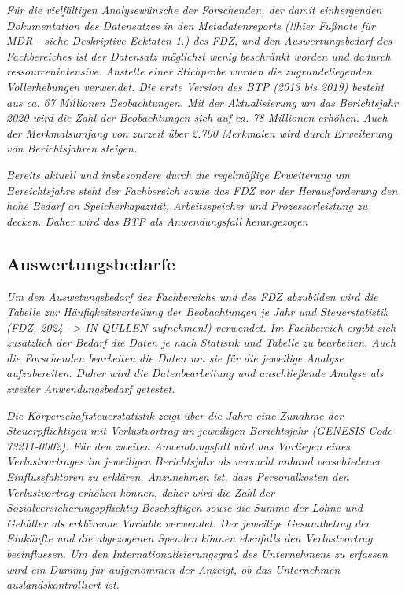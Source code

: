 \documentclass[
  german,
  10pt,
  twoside]{article}
\begin{document}
\emph{Für die vielfältigen Analysewünsche der Forschenden, der damit
einhergenden Dokumentation des Datensatzes in den Metadatenreports
(!!hier Fußnote für MDR - siehe Deskriptive Ecktaten 1.) des FDZ, und
den Auswertungsbedarf des Fachbereiches ist der Datensatz möglichst
wenig beschränkt worden und dadurch ressourcenintensive. Anstelle einer
Stichprobe wurden die zugrundeliegenden Vollerhebungen verwendet. Die
erste Version des BTP (2013 bis 2019) besteht aus ca. 67 Millionen
Beobachtungen. Mit der Aktualisierung um das Berichtsjahr 2020 wird die
Zahl der Beobachtungen sich auf ca. 78 Millionen erhöhen. Auch der
Merkmalsumfang von zurzeit über 2.700 Merkmalen wird durch Erweiterung
von Berichtsjahren steigen.}

\emph{Bereits aktuell und insbesondere durch die regelmäßige Erweiterung
um Bereichtsjahre steht der Fachbereich sowie das FDZ vor der
Herausforderung den hohe Bedarf an Speicherkapazität, Arbeitsspeicher
und Prozessorleistung zu decken. Daher wird das BTP als Anwendungsfall
herangezogen}

\subsection{Auswertungsbedarfe}\label{auswertungsbedarfe}

\emph{Um den Auswetungsbedarf des Fachbereichs und des FDZ abzubilden
wird die Tabelle zur Häufigkeitsverteilung der Beobachtungen je Jahr und
Steuerstatistik (FDZ, 2024 --\textgreater{} IN QULLEN aufnehmen!)
verwendet. Im Fachbereich ergibt sich zusätzlich der Bedarf die Daten je
nach Statistik und Tabelle zu bearbeiten. Auch die Forschenden
bearbeiten die Daten um sie für die jeweilige Analyse aufzubereiten.
Daher wird die Datenbearbeitung und anschließende Analyse als zweiter
Anwendungsbedarf getestet.}

\emph{Die Körperschaftsteuerstatistik zeigt über die Jahre eine Zunahme
der Steuerpflichtigen mit Verlustvortrag im jeweiligen Berichtsjahr
(GENESIS Code 73211-0002). Für den zweiten Anwendungsfall wird das
Vorliegen eines Verlustvortrages im jeweiligen Berichtsjahr als versucht
anhand verschiedener Einflussfaktoren zu erklären. Anzunehmen ist, dass
Personalkosten den Verlustvortrag erhöhen können, daher wird die Zahl
der Sozialversicherungspflichtig Beschäftigen sowie die Summe der Löhne
und Gehälter als erklärende Variable verwendet. Der jeweilige
Gesamtbetrag der Einkünfte und die abgezogenen Spenden können ebenfalls
den Verlustvortrag beeinflussen. Um den Internationalisierungsgrad des
Unternehmens zu erfassen wird ein Dummy für aufgenommen der Anzeigt, ob
das Unternehmen auslandskontrolliert ist.}
\end{document}
